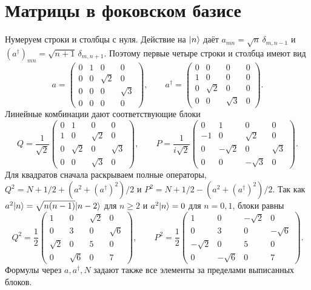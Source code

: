 \documentclass[11pt,a4paper]{article}
\begin{document}
\section{Матрицы в фоковском базисе}

Нумеруем строки и столбцы с нуля. Действие на \(\lvert n\rangle\)
даёт \(a_{mn}=\sqrt n\,\delta_{m,n-1}\) и
\((a^\dagger)_{mn}=\sqrt{n+1}\,\delta_{m,n+1}\).
Поэтому первые четыре строки и столбца имеют вид
\[
 a=\begin{pmatrix}
 0&1&0&0\\0&0&\sqrt2&0\\0&0&0&\sqrt3\\0&0&0&0
 \end{pmatrix},\qquad
 a^\dagger=\begin{pmatrix}
 0&0&0&0\\1&0&0&0\\0&\sqrt2&0&0\\0&0&\sqrt3&0
 \end{pmatrix}.
\]
Линейные комбинации дают соответствующие блоки
\[
 Q=\frac1{\sqrt2}\begin{pmatrix}
 0&1&0&0\\1&0&\sqrt2&0\\0&\sqrt2&0&\sqrt3\\0&0&\sqrt3&0
 \end{pmatrix},\qquad
 P=\frac1{i\sqrt2}\begin{pmatrix}
 0&1&0&0\\-1&0&\sqrt2&0\\0&-\sqrt2&0&\sqrt3\\0&0&-\sqrt3&0
 \end{pmatrix}.
\]
Для квадратов сначала раскрываем полные операторы,
\(Q^2=N+1/2+(a^2+(a^\dagger)^2)/2\) и
\(P^2=N+1/2-(a^2+(a^\dagger)^2)/2\).
Так как \(a^2\lvert n\rangle=\sqrt{n(n-1)}\lvert n-2\rangle\) для \(n\ge2\)
и \(a^2\lvert n\rangle=0\) для \(n=0,1\), блоки равны
\[
 Q^2=\frac12\begin{pmatrix}
 1&0&\sqrt2&0\\0&3&0&\sqrt6\\\sqrt2&0&5&0\\0&\sqrt6&0&7
 \end{pmatrix},\qquad
 P^2=\frac12\begin{pmatrix}
 1&0&-\sqrt2&0\\0&3&0&-\sqrt6\\-\sqrt2&0&5&0\\0&-\sqrt6&0&7
 \end{pmatrix}.
\]
Формулы через \(a,a^\dagger,N\) задают также все элементы за
пределами выписанных блоков.
\end{document}

